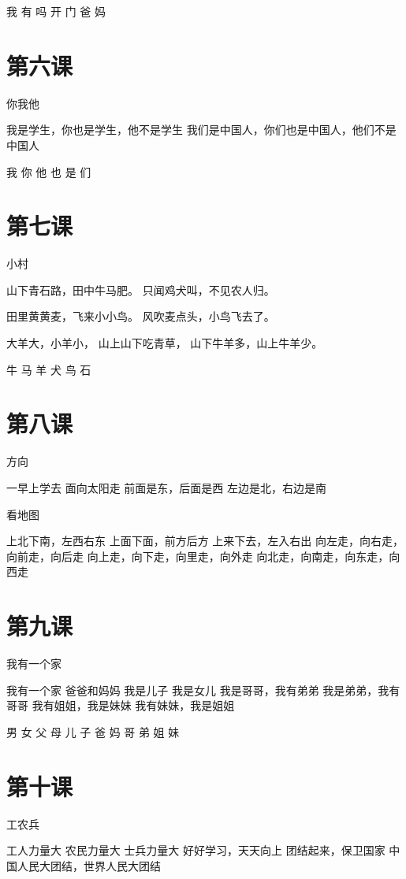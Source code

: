 \documentclass[12pt,UTF8]{ctexbook}
\begin{document}
我 有 吗 开 门 爸 妈

\section{第六课}

你我他

我是学生，你也是学生，他不是学生
我们是中国人，你们也是中国人，他们不是中国人

我 你 他 也 是 们

\section{第七课}

小村

山下青石路，田中牛马肥。
只闻鸡犬叫，不见农人归。

田里黄黄麦，飞来小小鸟。
风吹麦点头，小鸟飞去了。

大羊大，小羊小，
山上山下吃青草，
山下牛羊多，山上牛羊少。

牛 马 羊 犬 鸟 石

\section{第八课}

方向

一早上学去
面向太阳走
前面是东，后面是西
左边是北，右边是南

看地图

上北下南，左西右东
上面下面，前方后方
上来下去，左入右出
向左走，向右走，向前走，向后走
向上走，向下走，向里走，向外走
向北走，向南走，向东走，向西走

\section{第九课}

我有一个家

我有一个家
爸爸和妈妈
我是儿子
我是女儿
我是哥哥，我有弟弟
我是弟弟，我有哥哥
我有姐姐，我是妹妹
我有妹妹，我是姐姐

男 女 父 母 儿 子
爸 妈 哥 弟 姐 妹

\section{第十课}

工农兵

工人力量大
农民力量大
士兵力量大
好好学习，天天向上
团结起来，保卫国家
中国人民大团结，世界人民大团结
\end{document}
